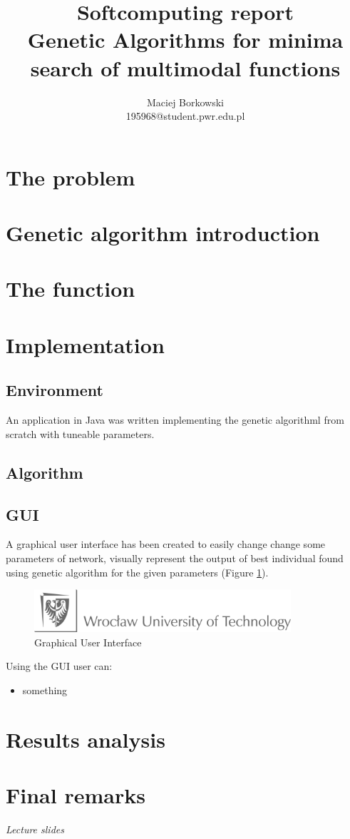 \documentclass[pdftex]{article}
\date{}
\title{\vspace{10ex} Softcomputing report \\ \vspace{6ex} Genetic Algorithms for minima search of multimodal functions
 \vspace{34ex}}
\author{Maciej Borkowski\\ 195968@student.pwr.edu.pl}
\begin{document}
\thispagestyle{empty}
\maketitle

\clearpage
\section{The problem}

\section{Genetic algorithm introduction}

\section{The function}

\section{Implementation}
\subsection{Environment}
An application in Java was written implementing the genetic algorithml from scratch with tuneable parameters.
\subsection{Algorithm}

\subsection{GUI}
A graphical user interface has been created to easily change change some parameters of network, visually represent the output of best individual found using genetic algorithm for the given parameters (Figure \ref{gui}).
\begin{figure}[!htb]
	\centering
	\includegraphics[width=0.85\textwidth]{pictures/gui.png} 
	\caption{Graphical User Interface}
	\label{gui}
\end{figure}
Using the GUI user can:
\begin{itemize}
\item{something}
\end{itemize}

\section{Results analysis}

\section{Final remarks}

 \begin{thebibliography}{1}
  {\em Lecture slides}
\end{thebibliography}
\end{document}
